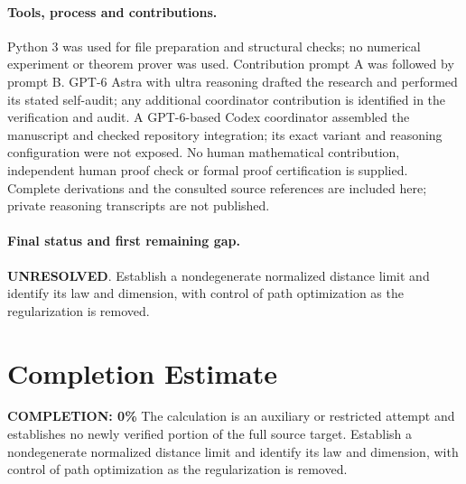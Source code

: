 \documentclass[11pt]{article}
\begin{document}
\paragraph{Tools, process and contributions.}
Python 3 was used for file preparation and structural checks; no numerical experiment or theorem prover was used. Contribution prompt A was followed by prompt B. GPT-6 Astra with ultra reasoning drafted the research and performed its stated self-audit; any additional coordinator contribution is identified in the verification and audit. A GPT-6-based Codex coordinator assembled the manuscript and checked repository integration; its exact variant and reasoning configuration were not exposed. No human mathematical contribution, independent human proof check or formal proof certification is supplied. Complete derivations and the consulted source references are included here; private reasoning transcripts are not published.

\paragraph{Final status and first remaining gap.}
\textbf{UNRESOLVED}. Establish a nondegenerate normalized distance limit and identify its law and dimension, with control of path optimization as the regularization is removed.

\section{Completion Estimate}
\noindent\textbf{COMPLETION: 0\%}
The calculation is an auxiliary or restricted attempt and establishes no newly verified portion of the full source target. Establish a nondegenerate normalized distance limit and identify its law and dimension, with control of path optimization as the regularization is removed.
\end{document}
